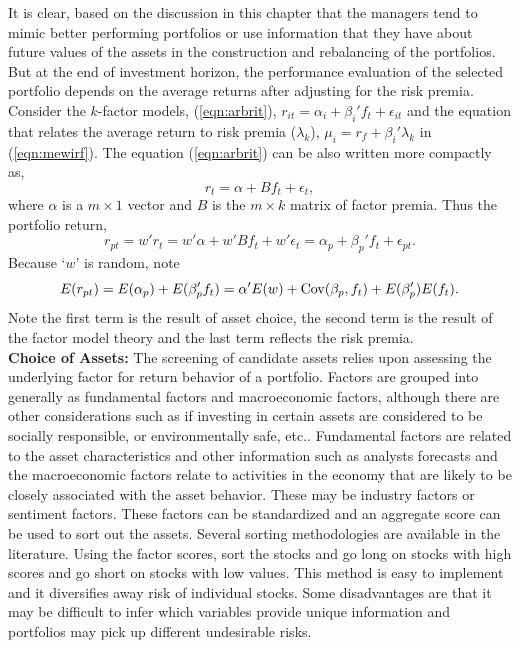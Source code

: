 It is clear, based on the discussion in this chapter that the managers tend to mimic better performing portfolios or use information that they have about future values of the assets in the construction and rebalancing of the portfolios. But at the end of investment horizon, the performance evaluation of the selected portfolio depends on the average returns after adjusting for the risk premia. Consider the $k$-factor models, (\ref{eqn:arbrit}), $r_{it}=\alpha_i + \beta_i' f_t + \epsilon_{it}$ and the equation that relates the average return to risk premia ($\lambda_k$), $\mu_i=r_f + \beta_i' \lambda_k$ in (\ref{eqn:mewirf}). The equation (\ref{eqn:arbrit}) can be also written more compactly as,
	\begin{equation}\label{eqn:compactarb}
	r_t= \alpha + B f_t + \epsilon_t,
	\end{equation}
where $\alpha$ is a $m \times 1$ vector and $B$ is the $m \times k$ matrix of factor premia. Thus the portfolio return,
	\begin{equation} \label{eqn:portreturn1}
	r_{pt}= w'r_t = w' \alpha+ w'B f_t + w' \epsilon_t= \alpha_p + \beta_p' f_t + \epsilon_{pt}.
	\end{equation}
Because `$w$' is random, note
	\begin{equation}\label{eqn:portreturnrandom}
	E(r_{pt})=E(\alpha_p) + E(\beta_p' f_t)= \alpha' E(w)+ \Cov(\beta_p,f_t) + E(\beta_p') E(f_t).
	\end{equation}
Note the first term is the result of asset choice, the second term is the result of the factor model theory and the last term reflects the risk premia. \\


\noindent \textbf{Choice of Assets:} The screening of candidate assets relies upon assessing the underlying factor for return behavior of a portfolio. Factors are grouped into generally as fundamental factors and macroeconomic factors, although there are other considerations such as if investing in certain assets are considered to be socially responsible, or environmentally safe, etc.. Fundamental factors are related to the asset characteristics and other information such as analysts forecasts and the macroeconomic factors relate to activities in the economy that are likely to be closely associated with the asset behavior. These may be industry factors or sentiment factors. These factors can be standardized and an aggregate score can be used to sort out the assets. Several sorting methodologies are available in the literature. Using the factor scores, sort the stocks and go long on stocks with high scores and go short on stocks with low values. This method is easy to implement and it diversifies away risk of individual stocks. Some disadvantages are that it may be difficult to infer which variables provide unique information and portfolios may pick up different undesirable risks. 


